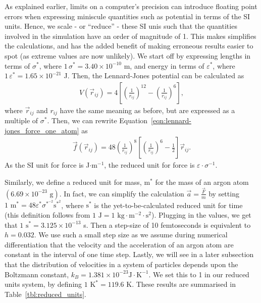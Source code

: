 \documentclass[../Main.tex]{subfiles}
\begin{document}
As explained earlier, limits on a computer's precision can introduce floating point errors when expressing miniscule quantities such as potential in terms of the SI units. Hence, we scale - or ``reduce'' - these SI unis such that the quantities involved in the simulation have an order of magnitude of 1. This makes simplifies the calculations, and has the added benefit of making erroneous results easier to spot (as extreme values are now unlikely). We start off by expressing lengths in terms of $\sigma^{*}$, where $1\, \sigma^{*} = 3.40 \times 10^{-10}$ m, and energy in terms of $\varepsilon^{*}$, where $1\, \varepsilon^{*}= 1.65 \times 10^{-21}$ J. Then, the Lennard-Jones potential can be calculated as
\begin{align}
	V\left(\vec{r}_{ij}\right) = 4 \left[ \left( \frac{1}{r_{ij}}\right)^{12} - \left( \frac{1}{r_{ij}}\right)^{6} \right], \label{eqn:lennard-jones_potential_reduced}
\end{align}
where $\vec{r}_{ij}$ and $r_{ij}$ have the same meaning as before, but are expressed as a multiple of $\sigma^{*}$.
Then, we can rewrite Equation~\ref{eqn:lennard-jones_force_one_atom} as
\begin{align}
\vec{f}\left(\vec{r}_{ij}\right) = 48\left( \frac{1}{r_{ij}}\right)^{8} \left[ \left( \frac{1}{r_{ij}}\right)^{6} - \frac{1}{2}\right]\vec{r}_{ij}. \label{eqn:lennard-jones_force_reduced_one_atom}
\end{align}
As the SI unit for force is J$\cdot\mbox{m}^{-1}$, the reduced unit for force is $\varepsilon\cdot\sigma^{-1}$.

Similarly, we define a reduced unit for mass, $\mbox{m}^{*}$ for the mass of an argon atom $\left(6.69 \times 10^{-23}\mbox{ g}\right)$. In fact, we can simplify the calculation $\vec{a} = \frac{\vec{F}}{m}$ by setting $1\mbox{ m}^{*} = 48\varepsilon^{*}\sigma^{*^{-2}}\mbox{s}^{*^{2}}$, where $\mbox{s}^{*}$ is the yet-to-be-calculated reduced unit for time (this definition follows from $1\mbox{ J} = 1 \mbox{ kg}\cdot\mbox{m}^{-2}\cdot \mbox{s}^{2}$). Plugging in the values, we get that $1 \mbox{ s}^{*} = 3.125 \times 10^{-13}$ s. Then a step-size of 10 femtoseconds is equivalent to $h = 0.032$. We use such a small step size as we assume during numerical differentiation that the velocity and the acceleration of an argon atom are constant in the interval of one time step.  
Lastly, we will see in a later subsection that the distribution of velocities in a system of particles depends upon the Boltzmann constant, $k_{B} = 1.381 \times 10^{-23} \mbox{J}\cdot\mbox{K}^{-1}$. We set this to 1 in our reduced units system, by defining $1 \mbox{ K}^{*} = 119.6\mbox{ K}$. These results are summarised in Table~\ref{tbl:reduced_units}.
\end{document}
